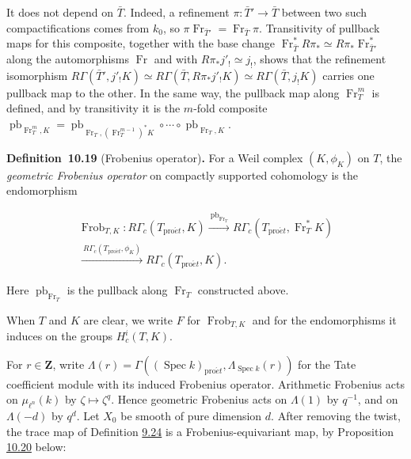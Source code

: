 \documentclass[11pt]{article}
\newenvironment{bpstatement}[2]{\par\addvspace{0.6\baselineskip}\noindent\textbf{#1}#2\textbf{.}\enspace\ignorespaces}
  {\par\addvspace{0.4\baselineskip}}
\begin{document}
It does not depend on \(\bar T\). Indeed, a refinement \(\pi:\bar T'\to\bar T\) between two such compactifications comes from \(k_0\), so \(\pi\operatorname{Fr}_{\bar T'}=\operatorname{Fr}_{\bar T}\pi\). Transitivity of pullback maps for this composite, together with the base change \(\operatorname{Fr}_{\bar T}^*R\pi_*\simeq R\pi_*\operatorname{Fr}_{\bar T'}^*\) along the automorphisms \(\operatorname{Fr}\) and with \(R\pi_*j'_!\simeq j_!\), shows that the refinement isomorphism \(R\Gamma(\bar T',j'_!K)\simeq R\Gamma(\bar T,R\pi_*j'_!K)
\simeq R\Gamma(\bar T,j_!K)\) carries one pullback map to the other. In the same way, the pullback map along \(\operatorname{Fr}_T^m\) is defined, and by transitivity it is the \(m\)-fold composite \(\operatorname{pb}_{\operatorname{Fr}_T^m,K}=\operatorname{pb}_{\operatorname{Fr}_T,(\operatorname{Fr}_T^{m-1})^*K}\circ\cdots\circ\operatorname{pb}_{\operatorname{Fr}_T,K}\).

\label{bp158}%
\begin{bpstatement}{Definition~10.19}{ (Frobenius operator)}
For a Weil complex \((K,\phi_K)\) on \(T\), the \emph{geometric Frobenius operator} on compactly supported cohomology is the endomorphism

\[
\begin{gathered}
\operatorname{Frob}_{T,K}:R\Gamma_c(T_{\mathrm{pro}\acute{e}t},K)
\xrightarrow{\ \operatorname{pb}_{\operatorname{Fr}_T}\ }
R\Gamma_c(T_{\mathrm{pro}\acute{e}t},\operatorname{Fr}_T^*K)\\
\xrightarrow{\ R\Gamma_c(T_{\mathrm{pro}\acute{e}t},\phi_K)\ }
R\Gamma_c(T_{\mathrm{pro}\acute{e}t},K).
\end{gathered}
\]

Here \(\operatorname{pb}_{\operatorname{Fr}_T}\) is the pullback along \(\operatorname{Fr}_T\) constructed above.
\end{bpstatement}

\label{bp159}%
When \(T\) and \(K\) are clear, we write \(F\) for \(\operatorname{Frob}_{T,K}\) and for the endomorphisms it induces on the groups \(H^i_c(T,K)\).

For \(r\in\mathbf Z\), write \(\Lambda(r)=\Gamma((\operatorname{Spec}k)_{\mathrm{pro}\acute{e}t},
\Lambda_{\operatorname{Spec}k}(r))\) for the Tate coefficient module with its induced Frobenius operator. Arithmetic Frobenius acts on \(\mu_{\ell^n}(k)\) by \(\zeta\mapsto\zeta^q\). Hence geometric Frobenius acts on \(\Lambda(1)\) by \(q^{-1}\), and on \(\Lambda(-d)\) by \(q^d\). Let \(X_0\) be smooth of pure dimension \(d\). After removing the twist, the trace map of Definition \hyperref[bp85]{9.24} is a Frobenius-equivariant map, by Proposition \hyperref[bp162]{10.20} below:
\end{document}
